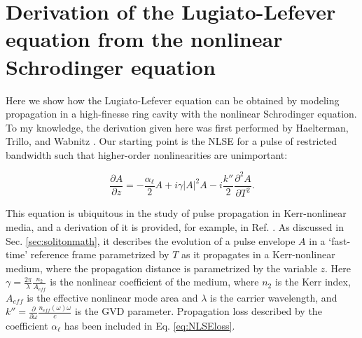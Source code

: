 \chapter{Derivation of the Lugiato-Lefever equation from the nonlinear Schrodinger equation}
 \label{app:LLEfromIkeda}


Here we show how the Lugiato-Lefever equation can be obtained by modeling propagation in a high-finesse ring cavity with the nonlinear Schrodinger equation. To my knowledge, the derivation given here was first performed by Haelterman, Trillo, and Wabnitz \cite{Haelterman1992a}. Our starting point is the NLSE for a pulse of restricted bandwidth such that higher-order nonlinearities are unimportant:


\begin{equation}
\frac{\partial A}{\partial z}= -\frac{\alpha_\ell}{2} A+i\gamma|A|^2 A -i \frac{k''}{2} \frac{\partial^2 A}{\partial T^2}. \label{eq:NLSEloss}
\end{equation}

This equation is ubiquitous in the study of pulse propagation in Kerr-nonlinear media, and a derivation of it is provided, for example, in Ref. \cite{Agrawal2007}. As discussed in Sec. \ref{sec:solitonmath}, it describes the evolution of a pulse envelope $A$ in a `fast-time' reference frame parametrized by $T$ as it propagates in a Kerr-nonlinear medium, where the propagation distance is parametrized by the variable $z$. Here $\gamma=\frac{2\pi}{\lambda}\frac{n_2}{A_{eff}}$ is the nonlinear coefficient of the medium, where $n_2$ is the Kerr index, $A_{eff}$ is the effective nonlinear mode area and $\lambda$ is the carrier wavelength, and $k''=\frac{\partial}{\partial\omega}\frac{n_{eff}(\omega)\omega}{c}$ is the GVD parameter. Propagation loss described by the coefficient $\alpha_\ell$ has been included in Eq. \ref{eq:NLSEloss}.

